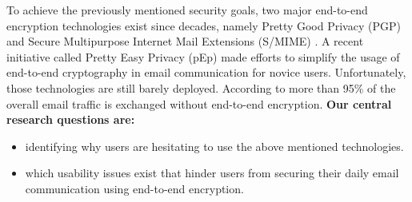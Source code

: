 To achieve the previously mentioned security goals, two major end-to-end encryption technologies exist since decades, namely Pretty Good Privacy (PGP) \cite{rfc1991} and Secure Multipurpose Internet Mail Extensions (S/MIME) \cite{rfc2633}. A recent initiative called Pretty Easy Privacy (pEp) \cite{pEp} made efforts to simplify the usage of end-to-end cryptography in email communication for novice users. Unfortunately, those technologies are still barely deployed. According to \cite{secureEmail} more than 95\% of the overall email traffic is exchanged without end-to-end encryption.
\newline
\newline
\textbf{Our central research questions are:}
\begin{itemize}
	\item identifying why users are hesitating to use the above mentioned technologies.
	\item which usability issues exist that hinder users from securing their daily email communication using end-to-end encryption.
\end{itemize}
